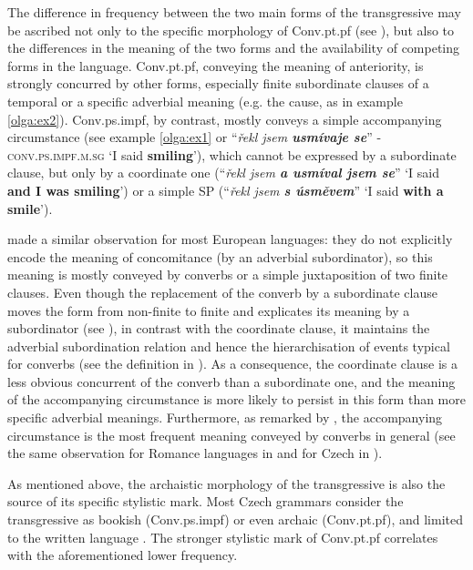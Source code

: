 \documentclass[output=paper,russian]{langsci/langscibook}
\begin{document}
The difference in frequency between the two main forms of the transgressive may be ascribed not only to the specific morphology of Conv.pt.pf (see ), but also to the differences in the meaning of the two forms and the availability of competing forms in the language. Conv.pt.pf, conveying the meaning of anteriority, is strongly concurred by other forms, especially finite subordinate clauses of a temporal or a specific adverbial meaning (e.g. the cause, as in example \ref{olga:ex2}). Conv.ps.impf, by contrast, mostly conveys a simple accompanying circumstance (see example \ref{olga:ex1} or \enquote{\textit{řekl jsem \textbf{usmívaje se}}} - \textsc{conv.ps.impf.m.sg} `I said \textbf{smiling}'), which cannot be expressed by a subordinate clause, but only by a coordinate one (\enquote{\textit{řekl jsem \textbf{a usmíval jsem se}}} `I said \textbf{and I was smiling}') or a simple SP (\enquote{\textit{řekl jsem \textbf{s úsměvem}}} `I said \textbf{with a smile}').

\textcite[281]{kortmann97} made a similar observation for most European languages: they do not explicitly encode the meaning of concomitance (by an adverbial subordinator), so this meaning is mostly conveyed by converbs or a simple juxtaposition of two finite clauses. Even though the replacement of the converb by a subordinate clause moves the form from non-finite to finite and explicates its meaning by a subordinator (see \cite{nadvornikova17}), in contrast with the coordinate clause, it maintains the adverbial subordination relation and hence the hierarchisation of events typical for converbs (see the definition in ). As a consequence, the coordinate clause is a less obvious concurrent of the converb than a subordinate one, and the meaning of the accompanying circumstance is more likely to persist in this form than more specific adverbial meanings. Furthermore, as remarked by \textcite{nedjalkov95}, the accompanying circumstance is the most frequent meaning conveyed by converbs in general (see the same observation for Romance languages in \textcite[122]{ceretal20} and for Czech in \textcite[33]{dvorak83}).

As mentioned above, the archaistic morphology of the transgressive is also the source of its specific stylistic mark. Most Czech grammars consider the transgressive as bookish (Conv.ps.impf) or even archaic (Conv.pt.pf), and limited to the written language \parencites[154]{komarek86}[249]{cvrcek10}[337]{karetal95}. The stronger stylistic mark of Conv.pt.pf correlates with the aforementioned lower frequency. 
\end{document}
